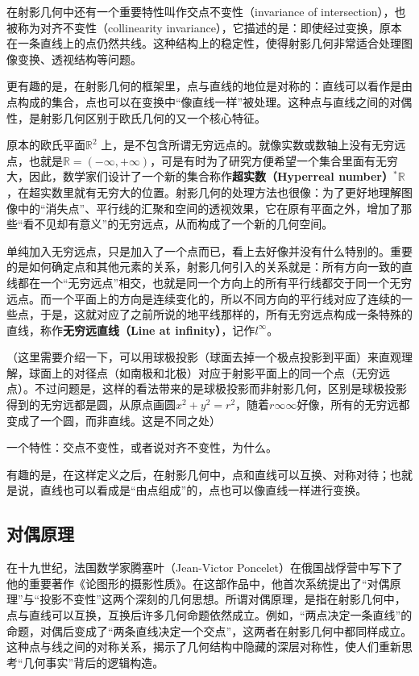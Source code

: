 在射影几何中还有一个重要特性叫作交点不变性（invariance of intersection），也被称为对齐不变性（collinearity invariance），它描述的是：即使经过变换，原本在一条直线上的点仍然共线。这种结构上的稳定性，使得射影几何非常适合处理图像变换、透视结构等问题。

更有趣的是，在射影几何的框架里，点与直线的地位是对称的：直线可以看作是由点构成的集合，点也可以在变换中“像直线一样”被处理。这种点与直线之间的对偶性，是射影几何区别于欧氏几何的又一个核心特征。







原本的欧氏平面$\mathbb{R}^2$ 上，是不包含所谓无穷远点的。就像实数或数轴上没有无穷远点，也就是$\mathbb{R}=(-\infty,+\infty)$，可是有时为了研究方便希望一个集合里面有无穷大，因此，数学家们设计了一个新的集合称作\textbf{超实数（Hyperreal number）}$^*\mathbb{R}$，在超实数里就有无穷大的位置。射影几何的处理方法也很像：为了更好地理解图像中的“消失点”、平行线的汇聚和空间的透视效果，它在原有平面之外，增加了那些“看不见却有意义”的无穷远点，从而构成了一个新的几何空间。

单纯加入无穷远点，只是加入了一个点而已，看上去好像并没有什么特别的。重要的是如何确定点和其他元素的关系，射影几何引入的关系就是：所有方向一致的直线都在一个“无穷远点”相交，也就是同一个方向上的所有平行线都交于同一个无穷远点。而一个平面上的方向是连续变化的，所以不同方向的平行线对应了连续的一些点，于是，这就对应了之前所说的地平线那样的，所有无穷远点构成一条特殊的直线，称作\textbf{无穷远直线（Line at infinity）}，记作$l^\infty$。

（这里需要介绍一下，可以用球极投影（球面去掉一个极点投影到平面）来直观理解，球面上的对径点（如南极和北极）对应于射影平面上的同一个点（无穷远点）。不过问题是，这样的看法带来的是球极投影而非射影几何，区别是球极投影得到的无穷远都是圆，从原点画圆$x^2+y^2=r^2$，随着$r\infty\infty$好像，所有的无穷远都变成了一个圆，而非直线。这是不同之处）

一个特性：交点不变性，或者说对齐不变性，为什么。

有趣的是，在这样定义之后，在射影几何中，点和直线可以互换、对称对待；也就是说，直线也可以看成是“由点组成”的，点也可以像直线一样进行变换。

\subsection{对偶原理}

在十九世纪，法国数学家腾塞叶（Jean-Victor Poncelet）在俄国战俘营中写下了他的重要著作《论图形的摄影性质》。在这部作品中，他首次系统提出了“对偶原理”与“投影不变性”这两个深刻的几何思想。所谓对偶原理，是指在射影几何中，点与直线可以互换，互换后许多几何命题依然成立。例如，“两点决定一条直线”的命题，对偶后变成了“两条直线决定一个交点”，这两者在射影几何中都同样成立。这种点与线之间的对称关系，揭示了几何结构中隐藏的深层对称性，使人们重新思考“几何事实”背后的逻辑构造。

